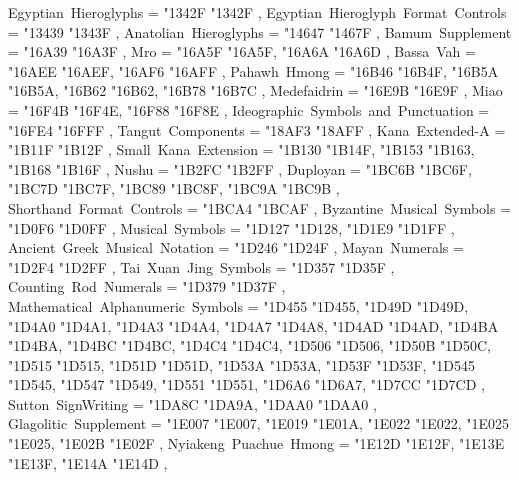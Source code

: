 {    Egyptian~Hieroglyphs                           = { {"1342F} {"1342F} },
    Egyptian~Hieroglyph~Format~Controls            = { {"13439} {"1343F} },
    Anatolian~Hieroglyphs                          = { {"14647} {"1467F} },
    Bamum~Supplement                               = { {"16A39} {"16A3F} },
    Mro                                            = { {"16A5F} {"16A5F}, {"16A6A} {"16A6D} },
    Bassa~Vah                                      = { {"16AEE} {"16AEF}, {"16AF6} {"16AFF} },
    Pahawh~Hmong                                   = { {"16B46} {"16B4F}, {"16B5A} {"16B5A}, {"16B62} {"16B62}, {"16B78} {"16B7C} },
    Medefaidrin                                    = { {"16E9B} {"16E9F} },
    Miao                                           = { {"16F4B} {"16F4E}, {"16F88} {"16F8E} },
    Ideographic~Symbols~and~Punctuation            = { {"16FE4} {"16FFF} },
    Tangut~Components                              = { {"18AF3} {"18AFF} },
    Kana~Extended-A                                = { {"1B11F} {"1B12F} },
    Small~Kana~Extension                           = { {"1B130} {"1B14F}, {"1B153} {"1B163}, {"1B168} {"1B16F} },
    Nushu                                          = { {"1B2FC} {"1B2FF} },
    Duployan                                       = { {"1BC6B} {"1BC6F}, {"1BC7D} {"1BC7F}, {"1BC89} {"1BC8F}, {"1BC9A} {"1BC9B} },
    Shorthand~Format~Controls                      = { {"1BCA4} {"1BCAF} },
    Byzantine~Musical~Symbols                      = { {"1D0F6} {"1D0FF} },
    Musical~Symbols                                = { {"1D127} {"1D128}, {"1D1E9} {"1D1FF} },
    Ancient~Greek~Musical~Notation                 = { {"1D246} {"1D24F} },
    Mayan~Numerals                                 = { {"1D2F4} {"1D2FF} },
    Tai~Xuan~Jing~Symbols                          = { {"1D357} {"1D35F} },
    Counting~Rod~Numerals                          = { {"1D379} {"1D37F} },
    Mathematical~Alphanumeric~Symbols              = { {"1D455} {"1D455}, {"1D49D} {"1D49D}, {"1D4A0} {"1D4A1}, {"1D4A3} {"1D4A4}, {"1D4A7} {"1D4A8}, {"1D4AD} {"1D4AD}, {"1D4BA} {"1D4BA}, {"1D4BC} {"1D4BC}, {"1D4C4} {"1D4C4}, {"1D506} {"1D506}, {"1D50B} {"1D50C}, {"1D515} {"1D515}, {"1D51D} {"1D51D}, {"1D53A} {"1D53A}, {"1D53F} {"1D53F}, {"1D545} {"1D545}, {"1D547} {"1D549}, {"1D551} {"1D551}, {"1D6A6} {"1D6A7}, {"1D7CC} {"1D7CD} },
    Sutton~SignWriting                             = { {"1DA8C} {"1DA9A}, {"1DAA0} {"1DAA0} },
    Glagolitic~Supplement                          = { {"1E007} {"1E007}, {"1E019} {"1E01A}, {"1E022} {"1E022}, {"1E025} {"1E025}, {"1E02B} {"1E02F} },
    Nyiakeng~Puachue~Hmong                         = { {"1E12D} {"1E12F}, {"1E13E} {"1E13F}, {"1E14A} {"1E14D} },
}
